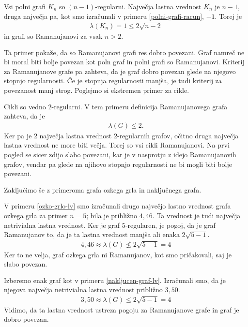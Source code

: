 \begin{primer}
    Vsi polni grafi \(K_n\) so \((n-1)\)-regularni. Največja lastna vrednost \(K_n\) je \(n-1\), druga največja pa, kot smo izračunali v primeru \ref{polni-grafi-racun}, \(-1\). Torej je
    \begin{align*}
        \lambda(K_n) = 1 \leq 2\sqrt{n-2}
    \end{align*}
    in grafi so Ramanujanovi za vsak \(n>2\).
\end{primer}
Ta primer pokaže, da so Ramanujanovi grafi res dobro povezani. Graf namreč ne bi moral biti bolje povezan kot poln graf in polni grafi so Ramanujanovi. Kriterij za Ramanujanove grafe pa zahteva, da je graf dobro povezan glede na njegovo stopnjo regularnosti. Če je stopnja regularnosti manjša, je tudi kriterij za povezanost manj strog. Poglejmo si ekstremen primer za cikle.
\begin{primer}[Cikli]
    Cikli so vedno \(2\)-regularni. V tem primeru definicija Ramanujanovega grafa zahteva, da je
    \begin{align*}
        \lambda(G) \leq 2.
    \end{align*}
    Ker pa je \(2\) največja lastna vrednost \(2\)-regularnih grafov, očitno druga največja lastna vrednost ne more biti večja. Torej so vsi cikli Ramanujanovi. Na prvi pogled se sicer zdijo slabo povezani, kar je v nasprotju z idejo Ramanujanovih grafov, vendar pa glede na njihovo stopnjo regularnosti ne bi mogli biti bolje povezani.
\end{primer}
Zaključimo še z primeroma grafa ozkega grla in naključnega grafa.
\begin{primer}
    V primeru \ref{ozko-grlo-lv} smo izračunali drugo največjo lastno vrednost grafa ozkega grla za primer \(n=5\); bila je približno \(4{,}46\). Ta vrednost je tudi največja netrivialna lastna vrednost. Ker je graf \(5\)-regularen, je pogoj, da je graf Ramanujanov to, da je ta lastna vrednost manjša ali enaka \(2\sqrt{5-1}\).
    \begin{align*}
       4{,}46 \approx \lambda(G) \not\leq 2\sqrt{5-1} = 4 
    \end{align*} 
    Ker to ne velja, graf ozkega grla ni Ramanujanov, kot smo pričakovali, saj je slabo povezan.
\end{primer}
\begin{primer}
    Izberemo enak graf kot v primeru \ref{nakljucen-graf-lv}. Izračunali smo, da je njegova največja netrivialna lastna vrednost približno \(3{,}50\).
    \begin{align*}
        3{,}50 \approx \lambda(G) \leq 2\sqrt{5-1} = 4  
     \end{align*}
     Vidimo, da ta lastna vrednost ustreza pogoju za Ramanujanove grafe in graf je dobro povezan.
\end{primer}

